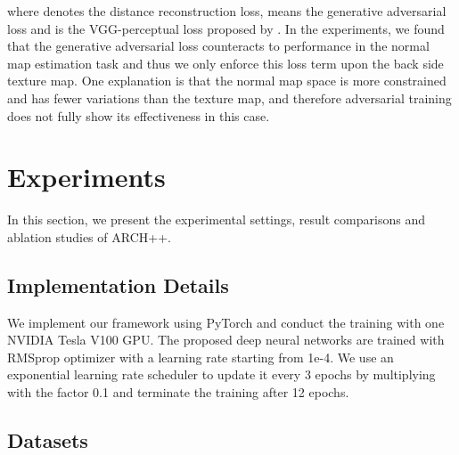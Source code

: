 \documentclass[10pt,twocolumn,letterpaper]{article}
\newcommand{\beforesection}{\vspace{-1.5mm}}
\newcommand{\aftersection}{\vspace{-1.5mm}}
\newcommand{\beforesubsection}{\vspace{-1.5mm}}
\begin{document}
where  denotes the  distance reconstruction loss,  means the generative adversarial loss and  is the VGG-perceptual loss proposed by \cite{johnson2016perceptual}. In the experiments, we found that the generative adversarial loss  counteracts to performance in the normal map estimation task and thus we only enforce this loss term upon the back side texture map.
One explanation is that the normal map space is more constrained and has fewer variations than the texture map, and therefore adversarial training does not fully show its effectiveness in this case.

\beforesection
\section{Experiments} \label{sec:experiments}
\aftersection

In this section, we present the experimental settings, result comparisons and ablation studies of ARCH++.

\beforesubsection
\subsection{Implementation Details}
\aftersection

We implement our framework using PyTorch and conduct the training with one NVIDIA Tesla V100 GPU. The proposed deep neural networks are trained with RMSprop optimizer with a learning rate starting from 1e-4. We use an exponential learning rate scheduler to update it every 3 epochs by multiplying with the factor \num{0.1} and terminate the training after 12 epochs.

\beforesubsection
\subsection{Datasets}
\aftersection
\end{document}
